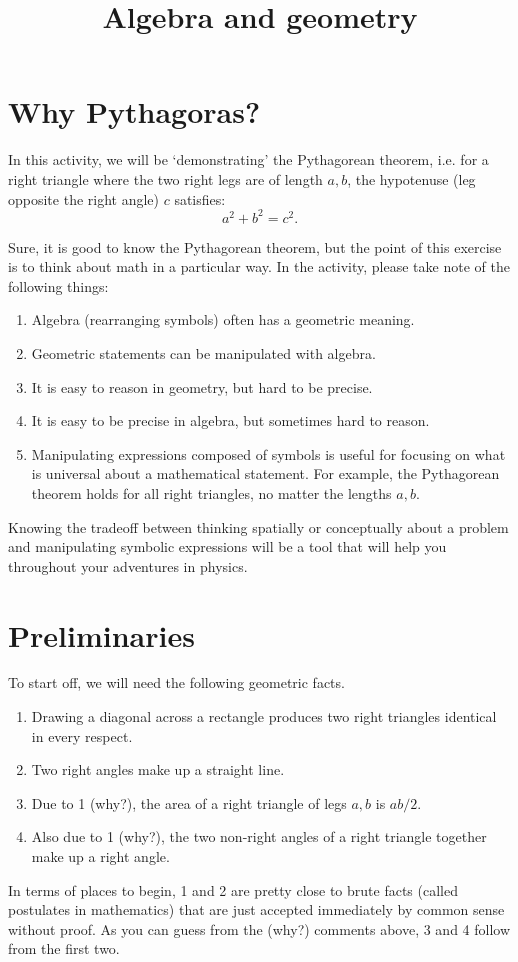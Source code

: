 \documentclass{handout}
\title{Algebra and geometry}
\begin{document}
\maketitle
\lectureactivity

\section{Why Pythagoras?}
In this activity, we will be `demonstrating' the Pythagorean theorem, i.e. for a right triangle where the two right legs are of length $a,b$, the hypotenuse (leg opposite the right angle) $c$ satisfies:
$$a^2 + b^2 = c^2. $$

Sure, it is good to know the Pythagorean theorem, but the point of this exercise is to think about math in a particular way. In the activity, please take note of the following things:
\begin{enumerate}
    \item Algebra (rearranging symbols) often has a geometric meaning.
    \item Geometric statements can be manipulated with algebra.
    \item It is easy to reason in geometry, but hard to be precise.
    \item It is easy to be precise in algebra, but sometimes hard to reason.
    \item Manipulating expressions composed of symbols is useful for focusing on what is universal about a mathematical statement. For example, the Pythagorean theorem holds for all right triangles, no matter the lengths $a,b$.
\end{enumerate}
Knowing the tradeoff between thinking spatially or conceptually about a problem and manipulating symbolic expressions will be a tool that will help you throughout your adventures in physics.

\section{Preliminaries}
To start off, we will need the following geometric facts.
\begin{enumerate}
    \item Drawing a diagonal across a rectangle produces two right triangles identical in every respect.
    \item Two right angles make up a straight line.
    \item Due to 1 (why?), the area of a right triangle of legs $a,b$ is $ab/2$.
    \item Also due to 1 (why?), the two non-right angles of a right triangle together make up a right angle.
\end{enumerate}
In terms of places to begin, 1 and 2 are pretty close to brute facts (called postulates in mathematics) that are just accepted immediately by common sense without proof. As you can guess from the (why?) comments above, 3 and 4 follow from the first two.
\end{document}

